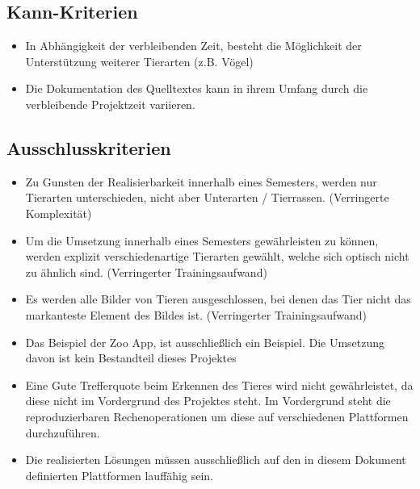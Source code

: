 \vspace{0.8cm}


\subsection*{\Large\textbf{Kann-Kriterien}}

\vspace{0.5cm}

\begin{itemize}
	\item In Abhängigkeit der verbleibenden Zeit, besteht die Möglichkeit der Unterstützung weiterer Tierarten (z.B. Vögel)
	\item Die Dokumentation des Quelltextes kann in ihrem Umfang durch die verbleibende Projektzeit variieren.
\end{itemize}

\vspace{0.8cm}


\subsection*{\Large\textbf{Ausschlusskriterien}}

\vspace{0.5cm}

\begin{itemize}
	\item Zu Gunsten der Realisierbarkeit innerhalb eines Semesters, werden nur Tierarten unterschieden, nicht aber Unterarten / Tierrassen. (Verringerte Komplexität)
	\item Um die Umsetzung innerhalb eines Semesters gewährleisten zu können, werden explizit verschiedenartige Tierarten gewählt, welche sich optisch nicht zu ähnlich sind. (Verringerter Trainingsaufwand)
	\item Es werden alle Bilder von Tieren ausgeschlossen, bei denen das Tier nicht das markanteste Element des Bildes ist. (Verringerter Trainingsaufwand)
	\item Das Beispiel der Zoo App, ist ausschließlich ein Beispiel. Die Umsetzung davon ist kein Bestandteil dieses Projektes
	\item Eine Gute Trefferquote beim Erkennen des Tieres wird nicht gewährleistet, da diese nicht im Vordergrund des Projektes steht. Im Vordergrund steht die reproduzierbaren Rechenoperationen um diese auf verschiedenen Plattformen durchzuführen.
	\item Die realisierten Lösungen müssen ausschließlich auf den in diesem Dokument definierten Plattformen lauffähig sein. 
\end{itemize}

